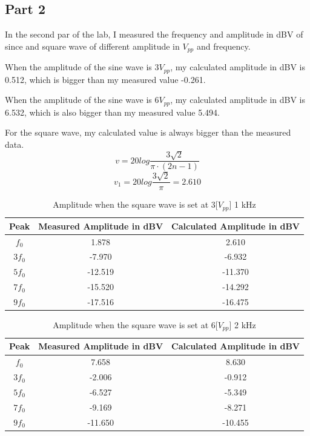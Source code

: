 \documentclass[12pt]{article}
\begin{document}
\subsection{Part 2}
In the second par of the lab, I measured the frequency and amplitude in dBV of since and square wave of different amplitude in $V_{pp}$ and frequency. 
\par When the amplitude of the sine wave is 3$V_{pp}$, my calculated amplitude in dBV is 0.512, which is bigger than my measured value -0.261.
\par When the amplitude of the sine wave is 6$V_{pp}$, my calculated amplitude in dBV is 6.532, which is also bigger than my measured value 5.494.
\par For the square wave, my calculated value is always bigger than the measured data.
$$v=20log\frac{3\sqrt{2}}{\pi\cdot(2n-1)}$$
$$v_1=20log\frac{3\sqrt{2}}{\pi}=2.610$$
\begin{table}[H]
\centering
\begin{tabular}{|c|c|c|}
\hline
Peak & Measured Amplitude in dBV & Calculated Amplitude in dBV \\ \hline
$f_0$      & 1.878                          & 2.610                            \\ \hline
$3f_0$     & -7.970                          &-6.932                             \\ \hline
$5f_0$     & -12.519                          &-11.370                             \\ \hline
$7f_0$     & -15.520                          &-14.292                             \\ \hline
$9f_0$     & -17.516                          &-16.475                             \\ \hline
\end{tabular}
\caption{Amplitude when the square wave is set at 3[$V_{pp}$] 1 kHz}
\end{table}
\begin{table}[H]
\centering
\begin{tabular}{|c|c|c|}
\hline
Peak & Measured Amplitude in dBV & Calculated Amplitude in dBV \\ \hline
$f_0$      & 7.658                          & 8.630                            \\ \hline
$3f_0$     & -2.006                          &-0.912                             \\ \hline
$5f_0$     & -6.527                          &-5.349                             \\ \hline
$7f_0$     & -9.169                          &-8.271                             \\ \hline
$9f_0$     & -11.650                          &-10.455                             \\ \hline
\end{tabular}
\caption{Amplitude when the square wave is set at 6[$V_{pp}$] 2 kHz}
\end{table}
\end{document}
